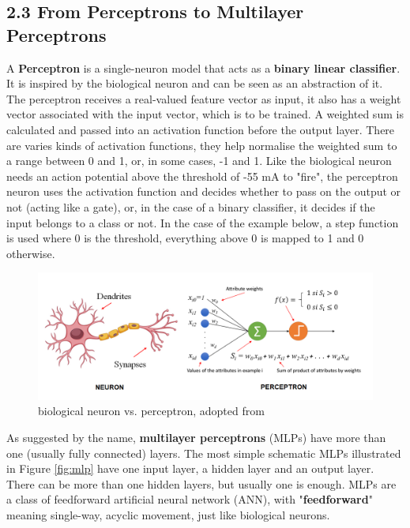 \documentclass[nobib]{tufte-handout}
\begin{document}
\subsection{2.3 \textbf{From Perceptrons to Multilayer Perceptrons}}

A \textbf{Perceptron} is a single-neuron model that acts as a \textbf{binary linear classifier}. It is inspired by the biological neuron and can be seen as an abstraction of it. The perceptron receives a real-valued feature vector as input, it also has a weight vector associated with the input vector, which is to be trained. A weighted sum is calculated and passed into an activation function before the output layer. There are varies kinds of activation functions, they help normalise the weighted sum to a range between 0 and 1, or, in some cases, -1 and 1. Like the biological neuron needs an action potential above the threshold of -55 mA to "fire", the perceptron neuron uses the activation function and decides whether to pass on the output or not (acting like a gate), or, in the case of a binary classifier, it decides if the input belongs to a class or not. In the case of the example below, a step function is used where 0 is the threshold, everything above 0 is mapped to 1 and 0 otherwise. \\
\begin{figure}[h!]
  \centering
  \includegraphics{perceptron1.png}
  \caption{biological neuron vs. perceptron, adopted from \cite{IF:perceptron}}
\end{figure}
As suggested by the name, \textbf{multilayer perceptrons} (MLPs) have more than one (usually fully connected) layers. The most simple schematic MLPs illustrated in Figure \ref{fig:mlp} have one input layer, a hidden layer and an output layer. There can be more than one hidden layers, but usually one is enough. MLPs are a class of feedforward artificial neural network (ANN), with "\textbf{feedforward}" meaning single-way, acyclic movement, just like biological neurons.\\ 
\end{document}
